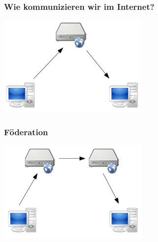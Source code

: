 \begin{frame}
    \frametitle{Wie kommunizieren wir im Internet?}
    \begin{center}
      \includegraphics[height=5cm]{img/c-s.png}
    \end{center}
\end{frame}

\begin{frame}
    \frametitle{Föderation}
    \begin{center}
      \includegraphics[height=5cm]{img/fed.png}
    \end{center}
\end{frame}
